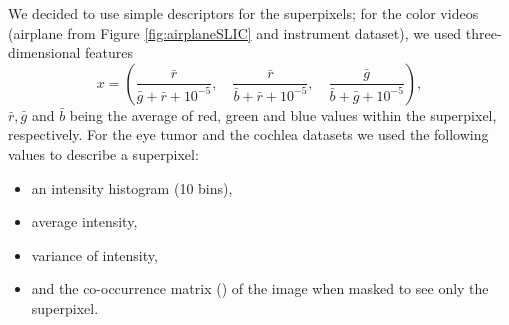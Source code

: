 We decided to use simple descriptors for the superpixels; for the color videos (airplane from Figure \ref{fig:airplaneSLIC} and instrument dataset), we used three-dimensional features
\begin{equation*}
 x = \left( \frac{\bar r}{\bar g + \bar r + 10^{-5}}, \quad \frac{\bar r }{\bar b +\bar r + 10^{-5}}, \quad \frac{\bar g}{ \bar b + \bar g + 10^{-5}}\right),
\end{equation*}
$\bar r, \bar g$ and $\bar b$ being the average of red, green and blue values within the superpixel, respectively. 
For the eye tumor and the cochlea datasets we used the following values to describe a superpixel:
\begin{itemize}
 \item an intensity histogram (10 bins),
 \item average intensity,
 \item variance of intensity,
 \item and the co-occurrence matrix (\cite{haralick1973textural}) of the image when masked to see only the superpixel.
\end{itemize}

